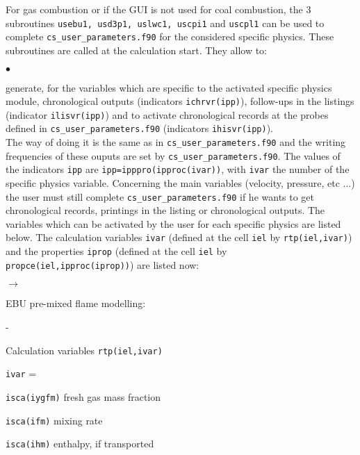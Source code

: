 {{For gas combustion or if the GUI is not used for coal combustion, the 3 subroutines \texttt{usebu1, usd3p1, uslwc1, uscpi1} and \texttt{uscpl1} can be used to complete \texttt{cs\_user\_parameters.f90} for the
considered specific physics. These subroutines are called at the calculation start.
They allow to:
\begin{list}{$\bullet$}{}
\item generate, for the variables which are specific to the activated
             specific physics module, chronological outputs (indicators
             \texttt{ichrvr(ipp)}), follow-ups in the listings
             (indicator \texttt{ilisvr(ipp)}) and to activate
             chronological records at the probes defined in
             \texttt{cs\_user\_parameters.f90} (indicators \texttt{ihisvr(ipp)}).\\
The way of doing it is the same as in \texttt{cs\_user\_parameters.f90} and the writing
      frequencies of these ouputs are set by \texttt{cs\_user\_parameters.f90}. The values
      of the indicators \texttt{ipp} are
      \texttt{ipp=ipppro(ipproc(ivar))}, with \texttt{ivar}
      the number of the specific physics variable.
Concerning the main variables (velocity, pressure, etc ...) the user
      must still complete \texttt{cs\_user\_parameters.f90} if he wants to get
      chronological records, printings in the listing or chronological
      outputs.
The variables which can be activated by the user for each specific
      physics are listed below. The calculation variables \texttt{ivar} (defined
      at the cell \texttt{iel} by \texttt{rtp(iel,ivar)}) and the properties
      \texttt{iprop} (defined at the cell \texttt{iel} by
      \texttt{propce(iel,ipproc(iprop))}) are listed now:
      \begin{list}{$\rightarrow$}{}
       \item EBU pre-mixed flame modelling:
       \begin{list}{-}{}
        \item Calculation variables \texttt{rtp(iel,ivar)}
              \begin{list}{\texttt{ivar} = }{}
               \item \texttt{isca(iygfm)} fresh gas mass fraction
               \item \texttt{isca(ifm)} mixing rate
               \item \texttt{isca(ihm)} enthalpy, if transported
              \end{list}

\end{list}
\end{list}
\end{list}}}
